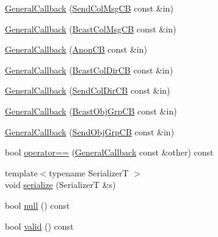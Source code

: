 \begin{DoxyCompactItemize}
\hyperlink{structvt_1_1pipe_1_1callback_1_1cbunion_1_1_general_callback_ae10672351b4cea94315778adbb3db189}{General\+Callback} (\hyperlink{structvt_1_1pipe_1_1callback_1_1cbunion_1_1_send_col_msg_c_b}{Send\+Col\+Msg\+CB} const \&in)
\item 
\hyperlink{structvt_1_1pipe_1_1callback_1_1cbunion_1_1_general_callback_ae81ae33ff2c69ee0daba75b4f245f63b}{General\+Callback} (\hyperlink{structvt_1_1pipe_1_1callback_1_1cbunion_1_1_bcast_col_msg_c_b}{Bcast\+Col\+Msg\+CB} const \&in)
\item 
\hyperlink{structvt_1_1pipe_1_1callback_1_1cbunion_1_1_general_callback_a4f33abfc02293e87d11cb5e45f9c79d3}{General\+Callback} (\hyperlink{structvt_1_1pipe_1_1callback_1_1cbunion_1_1_anon_c_b}{Anon\+CB} const \&in)
\item 
\hyperlink{structvt_1_1pipe_1_1callback_1_1cbunion_1_1_general_callback_ac88538719cabde41d9c7e87c605b6000}{General\+Callback} (\hyperlink{structvt_1_1pipe_1_1callback_1_1cbunion_1_1_bcast_col_dir_c_b}{Bcast\+Col\+Dir\+CB} const \&in)
\item 
\hyperlink{structvt_1_1pipe_1_1callback_1_1cbunion_1_1_general_callback_a35f3a8476e79e7344c87e3fc9626915f}{General\+Callback} (\hyperlink{structvt_1_1pipe_1_1callback_1_1cbunion_1_1_send_col_dir_c_b}{Send\+Col\+Dir\+CB} const \&in)
\item 
\hyperlink{structvt_1_1pipe_1_1callback_1_1cbunion_1_1_general_callback_a57183392fec38d4eb8338c6a91197005}{General\+Callback} (\hyperlink{structvt_1_1pipe_1_1callback_1_1cbunion_1_1_bcast_obj_grp_c_b}{Bcast\+Obj\+Grp\+CB} const \&in)
\item 
\hyperlink{structvt_1_1pipe_1_1callback_1_1cbunion_1_1_general_callback_aa694e51ea4f18e8153d84ff047901b20}{General\+Callback} (\hyperlink{structvt_1_1pipe_1_1callback_1_1cbunion_1_1_send_obj_grp_c_b}{Send\+Obj\+Grp\+CB} const \&in)
\item 
bool \hyperlink{structvt_1_1pipe_1_1callback_1_1cbunion_1_1_general_callback_a2b486d8ecc0783c96a13c69f68cad6dc}{operator==} (\hyperlink{structvt_1_1pipe_1_1callback_1_1cbunion_1_1_general_callback}{General\+Callback} const \&other) const
\item 
{\footnotesize template$<$typename SerializerT $>$ }\\void \hyperlink{structvt_1_1pipe_1_1callback_1_1cbunion_1_1_general_callback_aa55f63f6cf91b74776d10a0a21dfe8cd}{serialize} (SerializerT \&s)
\item 
bool \hyperlink{structvt_1_1pipe_1_1callback_1_1cbunion_1_1_general_callback_a83f4aa6c8934af199a34afe0d1266f3a}{null} () const
\item 
bool \hyperlink{structvt_1_1pipe_1_1callback_1_1cbunion_1_1_general_callback_a93dd476852ad5b9a3ad7b2223ba4bd86}{valid} () const
\end{DoxyCompactItemize}
